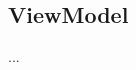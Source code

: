 \documentclass[../entwurf.tex]{subfiles}
\begin{document}
\subsection{ViewModel}
...
\end{document}
